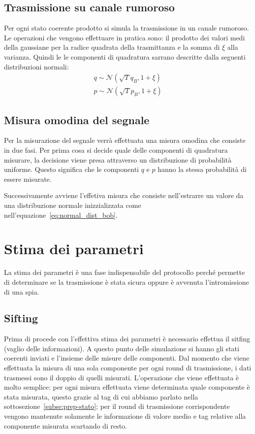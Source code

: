 \subsection{Trasmissione su canale rumoroso}
Per ogni stato coerente prodotto si simula la trasmissione in un canale rumoroso. Le operazioni che vengono effettuare in pratica sono: il prodotto dei valori medi della gaussiane per la radice quadrata della trasmittanza e la somma di $\xi$ alla varianza. Quindi le le componenti di quadratura sarrano descritte dalla seguenti distribuzioni normali:
\begin{equation}\label{eq:normal_dist_bob}
\begin{split}
q\sim \mathcal N(\sqrt{T} q_B, 1 + \xi) \\
p \sim \mathcal N(\sqrt{T} p_B, 1 + \xi)
\end{split}
\end{equation}
\subsection{Misura omodina del segnale}
Per la misurazione del segnale verr\`a effettuata una misura omodina che consiste in due fasi. Per prima cosa si decide quale delle componenti di quadratura misurare, la decisione viene presa attraverso un distribuzione di probabilit\`a uniforme. Questo significa che le componenti $q$ e $p$ hanno la stessa probabilit\`a di essere misurate.

Successivamente avviene l'effetiva misura che consiste nell'estrarre un valore da una distribuzione normale inizzializzata come nell'equazione~\ref{eq:normal_dist_bob}.

\section{Stima dei parametri}
La stima dei parametri \`e una fase indispensabile del protocollo perch\'e permette di determinare se la trasmissione \`e stata sicura oppure \`e avvenuta l'intromissione di una spia.

\subsection{Sifting}\label{subse:sifting}
Prima di procede con l'effettiva stima dei parametri \`e necessario effettua il sitfing (vaglio delle informazioni). A questo punto delle simulazione si hanno gli stati coerenti inviati e l'insieme delle misure delle componenti. Dal momento che viene effettuata la misura di una sola componente per ogni round di trasmissione, i dati trasmessi sono il doppio di quelli misurati. L'operazione che viene effettuata \`e molto semplice: per ogni misura effettuata viene determinata quale componente \`e stata misurata, questo grazie al tag di cui abbiamo parlato nella sottosezione~\ref{subse:prep-stato}; per il round di trasmissione corrispondente vengono mantenute solamente le informazione di valore medio e tag relative alla componente misurata scartando di resto.


